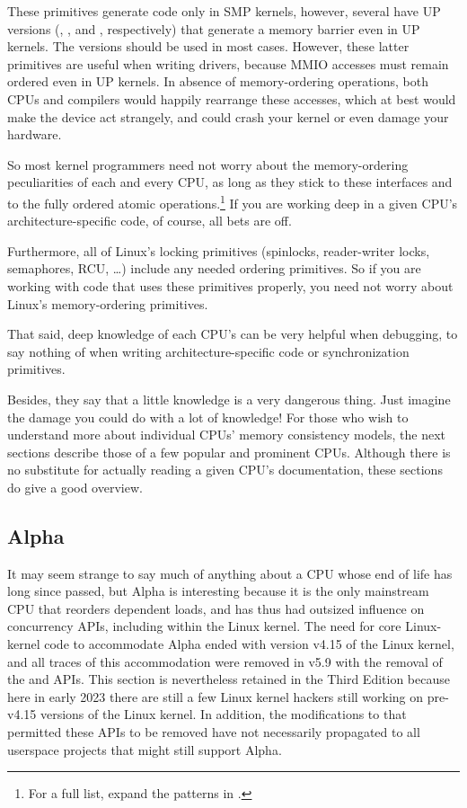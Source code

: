 These primitives generate code only in SMP kernels, however, several
have UP versions (, , and ,
respectively) that generate a memory barrier even in UP kernels.
The  versions should be used in most cases.
However, these latter primitives are useful when writing drivers,
because MMIO accesses must remain ordered even in UP kernels.
In absence of memory-ordering operations, both CPUs and compilers would
happily rearrange these accesses, which at best would make the device
act strangely, and could crash your kernel or even damage your hardware.

So most kernel programmers need not worry about the memory-ordering
peculiarities of each and every CPU, as long as they stick to these
interfaces and to the fully ordered atomic operations.\footnote{
	For a full list, expand the patterns in
	.}
If you are working deep in a given CPU's architecture-specific code,
of course, all bets are off.

Furthermore,
all of Linux's locking primitives (spinlocks, reader-writer locks,
semaphores, RCU, \ldots) include any needed ordering primitives.
So if you are working with code that uses these primitives properly,
you need not worry about Linux's memory-ordering primitives.

That said, deep knowledge of each CPU's
can be very helpful when debugging, to say nothing of when writing
architecture-specific code or synchronization primitives.

Besides, they say that a little knowledge is a very dangerous thing.
Just imagine the damage you could do with a lot of knowledge!
For those who wish to understand more about individual CPUs'
memory consistency models, the next sections describe those of a few
popular and prominent CPUs.
Although there is no substitute for actually reading a given CPU's
documentation, these sections do give a good overview.

\subsection{Alpha}
\label{sec:memorder:Alpha}

It may seem strange to say much of anything about a CPU whose end of life
has long since passed, but Alpha is interesting because it is the only
mainstream CPU that reorders dependent loads, and has thus had outsized
influence on concurrency APIs, including within the Linux kernel.
The need for core Linux-kernel code to accommodate Alpha ended
with version v4.15 of the Linux kernel, and all traces of this
accommodation were removed in v5.9 with the removal of the
 and  APIs.
This section is nevertheless retained in the Third Edition
because here in early 2023 there are still a few Linux kernel hackers
still working on pre-v4.15 versions of the Linux kernel.
In addition, the modifications to  that permitted
these APIs to be removed have not necessarily propagated to all
userspace projects that might still support Alpha.

